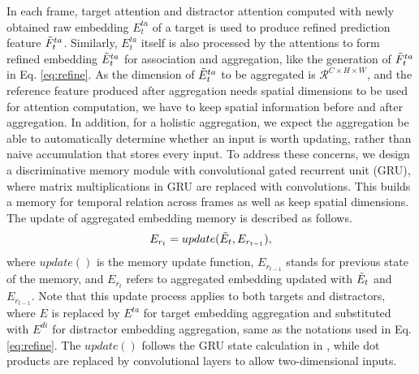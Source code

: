 \documentclass[final]{cvpr}
\begin{document}
In each frame, target attention and distractor attention computed with newly obtained raw embedding \(E^{ta}_t\) of a target is used to produce refined prediction feature \(\Tilde{F}^{ta}_t\). Similarly, \(E^{ta}_t\) itself is also processed by the attentions to form refined embedding \(\Tilde{E}^{ta}_t\) for association and aggregation, like the generation of \(\Tilde{F}^{ta}_t\) in Eq. \ref{eq:refine}.
As the dimension of \(\Tilde{E}^{ta}_t\) to be aggregated is \(\mathcal{R}^{C \times H \times W}\), and the reference feature produced after aggregation needs spatial dimensions to be used for attention computation, we have to keep spatial information before and after aggregation. In addition, for a holistic aggregation, we expect the aggregation be able to automatically determine whether an input is worth updating, rather than naive accumulation that stores every input. To address these concerns, we design a discriminative memory module with convolutional gated recurrent unit (GRU), where matrix multiplications in GRU are replaced with convolutions. This builds a memory for temporal relation across frames as well as keep spatial dimensions.
The update of aggregated embedding memory is described as follows.
\begin{align}
    E_{r_t} = update(\Tilde{E}_t, E_{r_{t-1}}),
  \label{eq:memory}
\end{align}
where \(update()\) is the memory update function, \(E_{r_{t-1}}\) stands for previous state of the memory, and \(E_{r_{t}}\) refers to aggregated embedding updated with \(\Tilde{E}_t\) and \(E_{r_{t-1}}\). Note that this update process applies to both targets and distractors, where \(E\) is replaced by \(E^{ta}\) for target embedding aggregation and substituted with \(E^{di}\) for distractor embedding aggregation, same as the notations used in Eq. \ref{eq:refine}. The \(update()\) follows the GRU state calculation in \cite{Cho2014}, while dot products are replaced by convolutional layers to allow two-dimensional inputs.
\end{document}
